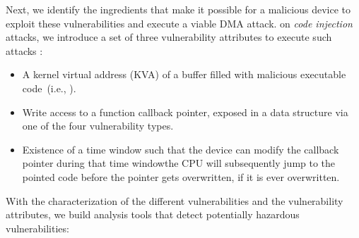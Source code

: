 
Next, \DIFdelbegin {}%
\DIFdelend we identify the ingredients that make it possible for a malicious device to exploit these \DIFaddbegin {}\subpage{} \DIFaddend vulnerabilities and execute a viable DMA attack.
\DIFdelbegin {}\DIFdelend \DIFaddbegin {}\DIFaddend on \emph{code injection} attacks\DIFdelbegin {}\DIFdelend , we introduce \DIFaddbegin {}\DIFaddend a set of three vulnerability attributes \DIFdelbegin {}\DIFdelend \DIFaddbegin {}\DIFaddend to execute such attacks\DIFdelbegin {}%
\DIFdelend :

\begin{itemize}
    \item A kernel virtual address (KVA) of a buffer filled with malicious executable code~(i.e., \mabaf).
    \item Write access to a function callback pointer, exposed in a data structure via one of the four \subpage vulnerability types. 
    \item Existence of a time window such that the device can modify the callback pointer during that time window\DIFdelbegin {}\DIFdelend \DIFaddbegin \DIFadd{; }\DIFaddend the CPU will subsequently jump to the pointed code \DIFdelbegin \DIFdel{(}\DIFdelend before the pointer gets overwritten, if it is ever overwritten\DIFdelbegin \DIFdel{)}\DIFdelend . 
\end{itemize} 

With the characterization of the different \subpage{} vulnerabilities and the vulnerability attributes, we \DIFaddbegin {}\DIFaddend build analysis tools that \DIFaddbegin {}\DIFaddend detect potentially hazardous \subpage{} vulnerabilities:

